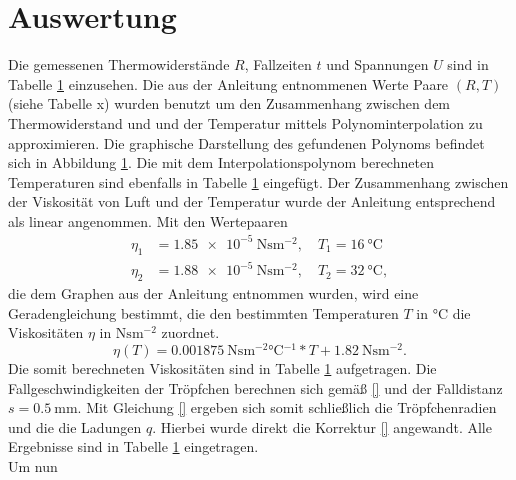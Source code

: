\section{Auswertung}
Die gemessenen Thermowiderstände $R$, Fallzeiten $t$ und Spannungen $U$ sind in Tabelle \ref{} einzusehen.
Die aus der Anleitung entnommenen Werte Paare $(R, T)$ (siehe Tabelle x) wurden benutzt um den Zusammenhang
zwischen dem Thermowiderstand und und der Temperatur mittels Polynominterpolation zu approximieren. Die graphische
Darstellung des gefundenen Polynoms befindet sich in Abbildung \ref{}. Die mit dem Interpolationspolynom berechneten
Temperaturen sind ebenfalls in Tabelle \ref{} eingefügt. Der Zusammenhang zwischen der Viskosität von Luft und
der Temperatur wurde der Anleitung \cite{} entsprechend als linear angenommen. Mit den Wertepaaren
\begin{align}
  \eta_1 &= \SI{1.85e-5}{\newton\second\meter^{-2}}, \quad T_1 = \SI{16}{\celsius} \\
  \eta_2 &= \SI{1.88e-5}{\newton\second\meter^{-2}}, \quad T_2 = \SI{32}{\celsius},
\end{align}
die dem Graphen aus der Anleitung entnommen wurden, wird eine Geradengleichung bestimmt, die den bestimmten Temperaturen
$T$ in $\si{\celsius}$ die Viskositäten $\eta$ in $\si{\newton\second\meter^{-2}}$ zuordnet.
\begin{equation}
  \eta(T) = \SI{0.001875}{\newton\second\meter^{-2} \celsius^{-1} } * T  + \SI{1.82}{\newton\second\meter^{-2}}.
\end{equation}
Die somit berechneten Viskositäten sind in Tabelle \ref{} aufgetragen.
Die Fallgeschwindigkeiten der Tröpfchen berechnen sich gemäß \eqref{} und der Falldistanz $s = \SI{0.5}{\milli\meter}$.
Mit Gleichung \eqref{} ergeben sich somit schließlich die Tröpfchenradien und die die Ladungen $q$. Hierbei wurde
direkt die Korrektur \eqref{} angewandt. Alle Ergebnisse sind in Tabelle \ref{} eingetragen. \\
Um nun 




